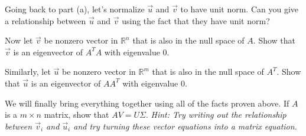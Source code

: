 \begin{enumerate}
  \qitem Going back to part (a), let's normalize $\vec{u}$ and $\vec{v}$ to have unit norm.
  Can you give a relationship between $\vec{u}$ and $\vec{v}$ using the fact that they have unit norm?


  \qitem Now let $\vec{v}$ be nonzero vector in $\mathbb{R}^{n}$ that is also in the null space of $A.$
  Show that $\vec{v}$ is an eigenvector of $A^{T} A$ with eigenvalue $0.$


  \qitem Similarly, let $\vec{u}$ be nonzero vector in $\mathbb{R}^{m}$ that is also in the null space of $A^{T}.$
  Show that $\vec{u}$ is an eigenvector of $AA^{T}$ with eigenvalue $0.$


  \qitem We will finally bring everything together using all of the facts proven above.
  If $A$ is a $m \times n$ matrix, show that $AV = U \Sigma.$ \textit{Hint: Try writing out the relationship between $\vec{v}_{i}$ and $\vec{u}_{i}$ and try turning these vector equations into a matrix equation.}


\end{enumerate}
